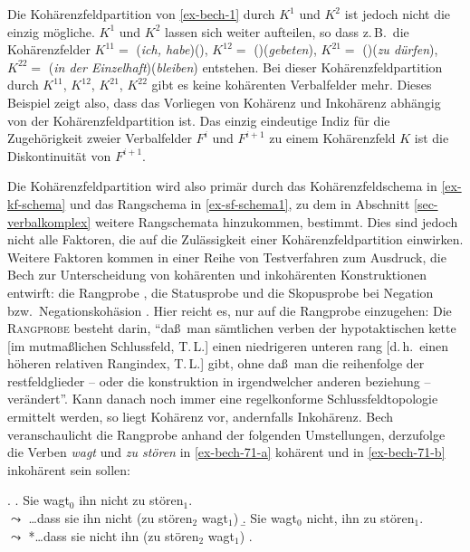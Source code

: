 Die Kohärenzfeldpartition von \ref{ex-bech-1} durch $K^1$ und $K^2$ ist jedoch nicht die einzig mögliche. $K^1$ und $K^2$ lassen sich weiter aufteilen, so dass z.\,B.\ die Kohärenzfelder $K^{11} =$ ({\it ich, habe})(), $K^{12} =$ ()({\it gebeten}), $K^{21} =$ ()({\it zu dürfen}), $K^{22} =$ ({\it in der Einzelhaft})({\it bleiben}) entstehen. Bei dieser Kohärenzfeldpartition durch $K^{11}$, $K^{12}$, $K^{21}$, $K^{22}$ gibt es keine kohärenten Verbalfelder mehr. Dieses Beispiel zeigt also, dass das Vorliegen von Kohärenz und Inkohärenz abhängig von der Kohärenzfeldpartition ist. Das einzig eindeutige Indiz für die Zugehörigkeit zweier Verbalfelder  $F^i$ und $F^{i+1}$ zu einem Kohärenzfeld $K$ ist die Diskontinuität von  $F^{i+1}$.

Die Kohärenzfeldpartition wird also primär durch das Kohärenzfeldschema in \ref{ex-kf-schema} und das Rangschema in \ref{ex-sf-schema1}, zu dem in Abschnitt \ref{sec-verbalkomplex} weitere Rangschemata hinzukommen, bestimmt. Dies sind jedoch nicht alle Faktoren, die auf die Zulässigkeit einer Kohärenzfeldpartition einwirken. Weitere Faktoren kommen in einer Reihe von Testverfahren zum Ausdruck, die Bech zur Unterscheidung von kohärenten und inkohärenten Konstruktionen entwirft: die Rangprobe \citep[\S 71]{Bech:55}, die Statusprobe \citep[\S 73]{Bech:55} und die Skopusprobe bei Negation bzw.\ Negationskohäsion \citep[\S 80]{Bech:55}. Hier reicht es, nur auf die Rangprobe einzugehen: Die \textsc{Rangprobe} besteht darin, "`da\ss\ man sämtlichen verben der hypotaktischen kette [im mutma\ss lichen Schlussfeld, T.\,L.] einen niedrigeren unteren rang [d.\,h.\ einen höheren relativen Rangindex, T.\,L.] gibt, ohne da\ss\ man die reihenfolge der restfeldglieder -- oder die konstruktion in irgendwelcher anderen beziehung -- verändert"'. Kann danach noch immer eine regelkonforme Schlussfeldtopologie ermittelt werden, so liegt Kohärenz vor, andernfalls Inkohärenz. Bech veranschaulicht die Rangprobe anhand der folgenden Umstellungen, derzufolge die Verben {\it wagt} und {\it zu stören} in \ref{ex-bech-71-a} kohärent und in \ref{ex-bech-71-b} inkohärent sein sollen:

\ex. \label{ex-bech-71}
\a. \label{ex-bech-71-a}Sie wagt$_0$ ihn nicht zu stören$_1$. \\
$\leadsto$ \ldots dass sie ihn nicht (zu stören$_2$ wagt$_1$)
\b. \label{ex-bech-71-b}Sie wagt$_0$ nicht, ihn zu stören$_1$. \\
$\leadsto$ *\ldots dass sie nicht ihn (zu stören$_2$ wagt$_1$)
\z. \citep[\S 71]{Bech:55}

